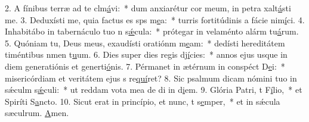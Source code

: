 2. A fínibus terræ ad te clm\uline{á}vi:~* dum anxiarétur cor meum, in petra xalt\uline{á}sti me.
3. Deduxísti me, quia factus es sps m\uline{e}a:~* turris fortitúdinis a fácie nim\uline{í}ci.
4. Inhabitábo in tabernáculo tuo n s\uline{ǽ}cula:~* prótegar in velaménto alárm tu\uline{á}rum.
5. Quóniam tu, Deus meus, exaudísti oratiónm m\uline{e}am:~* dedísti hereditátem timéntibus nmen t\uline{u}um.
6. Dies super dies regis dj\uline{í}cies:~* annos ejus usque in diem generatiónis et generti\uline{ó}nis.
7. Pérmanet in ætérnum in conspéct D\uline{e}i:~* misericórdiam et veritátem ejus s re\uline{quí}ret?
8. Sic psalmum dicam nómini tuo in sǽculm s\uline{ǽ}culi:~* ut reddam vota mea de di in d\uline{i}em.
9. Glória Patri, t F\uline{í}lio,~* et Spiríti S\uline{a}ncto.
10. Sicut erat in princípio, et nunc, t s\uline{e}mper,~* et in sǽcula sæculrum. \uline{A}men.

